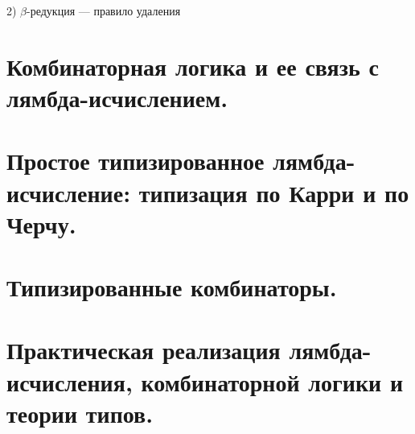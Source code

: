 \documentclass[a4paper]{article}
\begin{document}
2) $\beta$-редукция --- правило удаления

\section{Комбинаторная логика и ее связь с лямбда-исчислением.}
\section{Простое типизированное лямбда-исчисление: типизация по Карри и по Черчу.}
\section{Типизированные комбинаторы.}
\section{Практическая реализация лямбда-исчисления, комбинаторной логики и теории типов.}
\end{document}
